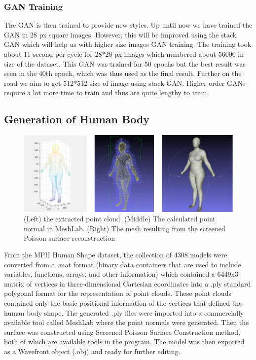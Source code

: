 \documentclass{article}
\begin{document}
    \subsubsection{GAN Training}
    The GAN is then trained to provide new styles. Up until now we have trained the GAN in 28 px square images. However, this will be improved using the stack GAN which will help us with higher size images GAN training. The training took about 11 second per cycle for 28*28 px images which numbered about 56000 in size of the dataset. This GAN was trained for 50 epochs but the best result was seen in the 40th epoch, which was thus used as the final result. Further on the road we aim to get 512*512 size of image using stack GAN. Higher order GANs require a lot more time to train and thus are quite lengthy to train.
    \subsection{Generation of Human Body}
    
    \begin{figure}[h]
        \centering
        \includegraphics[width=15cm]{images/humanModel.png}
        \caption{(Left) the extracted point cloud. (Middle) The calculated point normal in MeshLab. (Right) The mesh resulting from the screened Poisson surface reconstruction}
        \label{(Left) the extracted point cloud. (Middle) The calculated point normal in MeshLab. (Right) The mesh resulting from the screened Poisson surface reconstruction(Left) the extracted point cloud. (Middle) The calculated point normal in MeshLab. (Right) The mesh resulting from the screened Poisson surface reconstruction}
    \end{figure}
    From the MPII Human Shape dataset, the collection of 4308 models were converted from a .mat format (binary data containers that are used to include variables, functions, arrays, and other information) which contained a 6449x3 matrix of vertices in three-dimensional Cartesian coordinates into a .ply standard polygonal format for the representation of point clouds. These point clouds contained only the basic positional information of the vertices that defined the human body shape. The generated .ply files were imported into a commercially available tool called MeshLab where the point normals were generated. Then the surface was constructed using Screened Poisson Surface Construction method, both of which are available tools in the program. The model was then exported as a Wavefront object (.obj) and ready for further editing.
    
\end{document}
